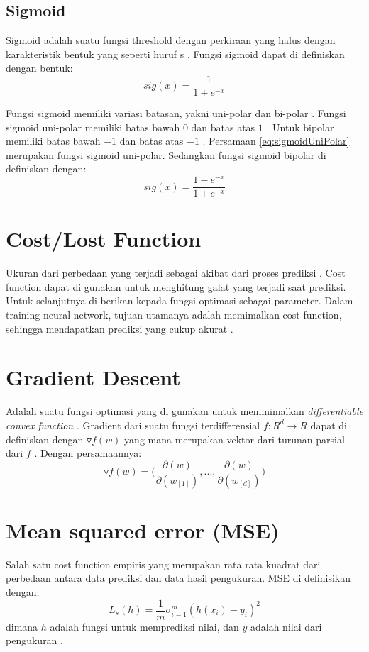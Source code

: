 \subsection{Sigmoid}
    Sigmoid adalah suatu fungsi threshold dengan perkiraan yang halus dengan karakteristik bentuk yang seperti huruf s \cite{ShaiUnderstandingMachineLearning}. Fungsi sigmoid dapat di definiskan dengan bentuk:
    \begin{equation}
        sig(x) = \frac{1}{1+e^{-x}}
        \label{eq:sigmoidUniPolar}
    \end{equation}

    Fungsi sigmoid memiliki variasi batasan, yakni uni-polar dan bi-polar \cite{KarlicOlgacPerformanceAnalysis}. Fungsi sigmoid uni-polar memiliki batas bawah $0$ dan batas atas $1$ \cite{KarlicOlgacPerformanceAnalysis}. Untuk bipolar memiliki batas bawah $-1$ dan batas atas $-1$ \cite{KarlicOlgacPerformanceAnalysis}.
    Persamaan \ref{eq:sigmoidUniPolar} merupakan fungsi sigmoid uni-polar. Sedangkan fungsi sigmoid bipolar di definiskan dengan:
    \begin{equation}
        sig(x) = \frac{1-e^{-x}}{1+e^{-x}}
    \end{equation}
\section{Cost/Lost Function}
    Ukuran dari perbedaan yang terjadi sebagai akibat dari proses prediksi \cite{MLBishop}. Cost function dapat di gunakan untuk menghitung galat yang terjadi saat prediksi. Untuk selanjutnya di berikan kepada fungsi optimasi sebagai parameter. Dalam training neural network, tujuan utamanya adalah memimalkan cost function, sehingga mendapatkan prediksi yang cukup akurat \cite{MLBishop}.
\section{Gradient Descent}
    Adalah suatu fungsi optimasi yang di gunakan untuk meminimalkan \emph{differentiable convex function} \cite{ShaiUnderstandingMachineLearning}. Gradient dari suatu fungsi terdifferensial $f : R^d \rightarrow R$ dapat di definiskan dengan $\triangledown f(w)$ yang mana merupakan vektor dari turunan parsial dari $f$ \cite{ShaiUnderstandingMachineLearning}. Dengan persamaannya:
    \begin{equation}
        \triangledown f(w) = \Big( \frac{\partial(w)}{\partial(w_{[1]})} ,... ,\frac{\partial(w)}{\partial(w_{[d]})} \Big)
    \end{equation}
\section{Mean squared error (MSE)}
    Salah satu cost function empiris yang merupakan rata rata kuadrat dari perbedaan antara data prediksi dan data hasil pengukuran. MSE di definisikan dengan:
    \begin{equation}
        L_s(h) = \frac{1}{m}\sigma^m_{i=1}(h(x_i) - y_i)^2
    \end{equation}
    dimana $h$ adalah fungsi untuk memprediksi nilai, dan $y$ adalah nilai dari pengukuran \cite{ShaiUnderstandingMachineLearning}. 
